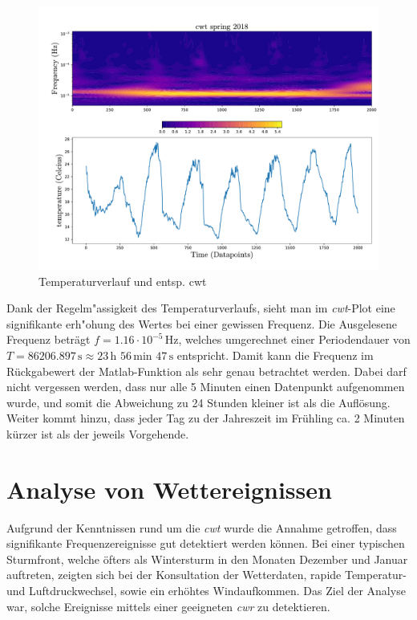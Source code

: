 \begin{refsection}
\begin{figure}[h]
	\centering
	\includegraphics[width=1\textwidth]{papers/wwt/images/data_spring.pdf}
	\caption{Temperaturverlauf und entsp. cwt}
	\label{fig:cwt_zoom}
\end{figure}

Dank der Regelm"assigkeit des Temperaturverlaufs, sieht man im \textit{cwt}-Plot eine signifikante erh"ohung des Wertes bei einer gewissen Frequenz.
Die Ausgelesene Frequenz beträgt $f = 1.16\cdot10^{-5} \,\text{Hz}$, welches umgerechnet einer Periodendauer von $T = 86206.897\,\text{s}\approx 23\,\text{h }56\,\text{min } 47\,\text{s}$ entspricht.
Damit kann die Frequenz im Rückgabewert der Matlab-Funktion als sehr genau betrachtet werden. Dabei darf nicht vergessen werden, dass nur alle 5 Minuten einen Datenpunkt aufgenommen wurde, und somit die Abweichung zu 24 Stunden kleiner ist als die Auflösung.
Weiter kommt hinzu, dass jeder Tag zu der Jahreszeit im Frühling ca. 2 Minuten kürzer ist als der jeweils Vorgehende.\cite{online:sunset_time}




\section{Analyse von Wettereignissen}
Aufgrund der Kenntnissen rund um die \textit{cwt} wurde die Annahme getroffen, dass signifikante Frequenzereignisse gut detektiert werden können.
Bei einer typischen Sturmfront, welche öfters als Wintersturm in den Monaten Dezember und Januar auftreten, zeigten sich bei der Konsultation der Wetterdaten, rapide Temperatur- und Luftdruckwechsel, sowie ein erhöhtes Windaufkommen.
Das Ziel der Analyse war, solche Ereignisse mittels einer geeigneten \textit{cwr} zu detektieren.

\end{refsection}
